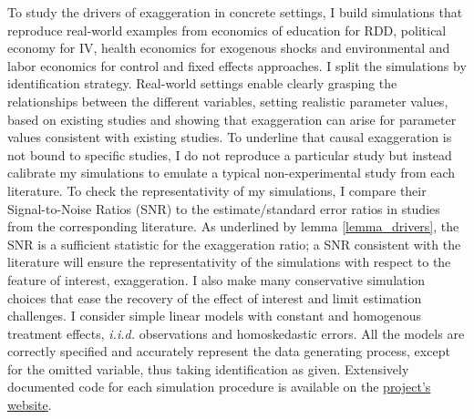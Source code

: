 \documentclass[usletter, 12pt]{article}
\begin{document}
    		To study the drivers of exaggeration in concrete settings, I build simulations that reproduce real-world examples from economics of education for RDD, %
		political economy for IV, health economics for exogenous shocks and environmental and labor economics for control and fixed effects approaches. I split the simulations by identification strategy. %
		 Real-world settings enable clearly grasping the relationships between the different variables, setting realistic parameter values, based on existing studies and showing that exaggeration can arise for parameter values consistent with existing studies. To underline that causal exaggeration is not bound to specific studies, I do not reproduce a particular study but instead calibrate my simulations to emulate a typical non-experimental study from each literature. To check the representativity of my simulations, I compare their Signal-to-Noise Ratios (SNR) to the estimate/standard error ratios in studies from the corresponding literature. As underlined by lemma \ref{lemma_drivers}, the SNR is a sufficient statistic for the exaggeration ratio; a SNR consistent with the literature will ensure the representativity of the simulations with respect to the feature of interest, exaggeration. 
		 I also make many conservative simulation choices that ease the recovery of the effect of interest and limit estimation challenges. I consider simple linear models with constant and homogenous treatment effects, \textit{i.i.d.} observations and homoskedastic errors. All the models are correctly specified and accurately represent the data generating process, except for the omitted variable, thus taking identification as given. 
		Extensively documented code for each simulation procedure is available on the \href{https://vincentbagilet.github.io/causal_exaggeration/}{project's website}.
		
\end{document}
